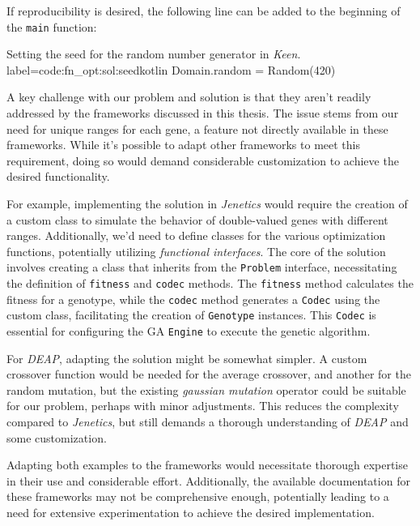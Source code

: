         If reproducibility is desired, the following line can be added to the
        beginning of the \texttt{main} function:

        \begin{code}{
            Setting the seed for the random number generator in \textit{Keen}.
        }{label=code:fn_opt:sol:seed}{kotlin}
            Domain.random = Random(420)
        \end{code}

        A key challenge with our problem and solution is that they aren't readily addressed by the frameworks discussed 
        in this thesis. The issue stems from our need for unique ranges for each gene, a feature not directly available 
        in these frameworks. While it's possible to adapt other frameworks to meet this requirement, doing so would 
        demand considerable customization to achieve the desired functionality.

        For example, implementing the solution in \textit{Jenetics} would require the creation of a custom class to
        simulate the behavior of double-valued genes with different ranges. Additionally, we'd need to define classes 
        for the various optimization functions, potentially utilizing \textit{functional interfaces}. The core of the 
        solution involves creating a class that inherits from the \texttt{Problem} interface, necessitating the 
        definition of \texttt{fitness} and \texttt{codec} methods. The \texttt{fitness} method calculates the fitness 
        for a genotype, while the \texttt{codec} method generates a \texttt{Codec} using the custom class, facilitating 
        the creation of \texttt{Genotype} instances. This \texttt{Codec} is essential for configuring the GA 
        \texttt{Engine} to execute the genetic algorithm.

        For \textit{DEAP}, adapting the solution might be somewhat simpler. A custom crossover function would be needed 
        for the average crossover, and another for the random mutation, but the existing \textit{gaussian mutation} 
        operator could be suitable for our problem, perhaps with minor adjustments. This reduces the complexity 
        compared to \textit{Jenetics}, but still demands a thorough understanding of \textit{DEAP} and some 
        customization.

        Adapting both examples to the frameworks would necessitate thorough expertise in their use and considerable 
        effort. Additionally, the available documentation for these frameworks may not be comprehensive enough, 
        potentially leading to a need for extensive experimentation to achieve the desired implementation.